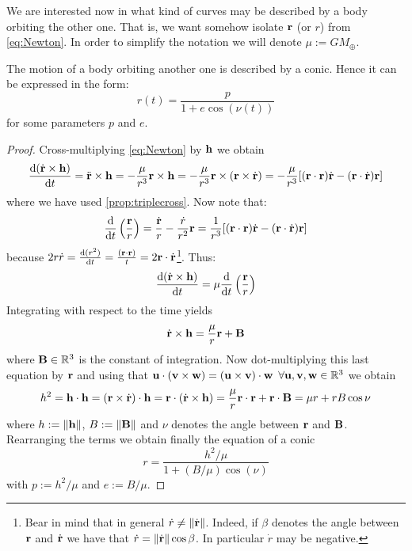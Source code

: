 \documentclass[../main.tex]{subfiles}
\begin{document}
We are interested now in what kind of curves may be described by a body orbiting the other one. That is, we want somehow isolate $\boldsymbol{\mathrm{r}}$ (or $r$) from \cref{eq:Newton}. In order to simplify the notation we will denote $\mu:=GM_{\oplus}$.
\begin{proposition}
  \label{prop:two-body}
  The motion of a body orbiting another one is described by a conic. Hence it can be expressed in the form:
  \begin{equation}
    \label{eq:two-body}
    r(t)=\frac{p}{1+e\cos (\nu(t))}
  \end{equation}
  for some parameters $p$ and $e$.
\end{proposition}
\begin{proof}
  Cross-multiplying \cref{eq:Newton} by $\boldsymbol{\mathrm{h}}$ we obtain
  \begin{equation}
    \dv{(\dot{\boldsymbol{\mathrm{r}}}\times\boldsymbol{\mathrm{h}})}{t}=\ddot{\boldsymbol{\mathrm{r}}}\times\boldsymbol{\mathrm{h}}=-\frac{\mu}{r^3}\boldsymbol{\mathrm{r}}\times\boldsymbol{\mathrm{h}}=-\frac{\mu}{r^3}\boldsymbol{\mathrm{r}}\times(\boldsymbol{\mathrm{r}}\times \dot{\boldsymbol{\mathrm{r}}})=-\frac{\mu}{r^3}[(\boldsymbol{\mathrm{r}}\cdot{\boldsymbol{\mathrm{r}}})\dot{\boldsymbol{\mathrm{r}}}-(\boldsymbol{\mathrm{r}}\cdot\dot{\boldsymbol{\mathrm{r}}})\boldsymbol{\mathrm{r}}]
  \end{equation}
  where we have used \cref{prop:triplecross}. Now note that:
  \begin{equation}
    \dv{}{t}\left(\frac{\boldsymbol{\mathrm{r}}}{r}\right)=\frac{\dot{\boldsymbol{\mathrm{r}}}}{r}-\frac{\dot{r}}{r^2}\boldsymbol{\mathrm{r}}= \frac{1}{r^3}[(\boldsymbol{\mathrm{r}}\cdot{\boldsymbol{\mathrm{r}}})\dot{\boldsymbol{\mathrm{r}}}-(\boldsymbol{\mathrm{r}}\cdot\dot{\boldsymbol{\mathrm{r}}})\boldsymbol{\mathrm{r}}]
  \end{equation}
  because $2r\dot{r}=\dv{(r^2)}{t}=\frac{(\boldsymbol{\mathrm{r}}\cdot\boldsymbol{\mathrm{r}})}{t}=2\boldsymbol{\mathrm{r}}\cdot\dot{\boldsymbol{\mathrm{r}}}$\footnote{Bear in mind that in general $\dot{r}\ne\left\|\dot{\boldsymbol{\mathrm{r}}}\right\|$. Indeed, if $\beta$ denotes the angle between $\boldsymbol{\mathrm{r}}$ and $\dot{\boldsymbol{\mathrm{r}}}$ we have that $\dot{r}=\left\|\dot{\boldsymbol{\mathrm{r}}}\right\|\cos\beta$. In particular $\dot{r}$ may be negative.}. Thus:
  \begin{equation}
    \dv{(\dot{\boldsymbol{\mathrm{r}}}\times\boldsymbol{\mathrm{h}})}{t}=\mu \dv{}{t}\left(\frac{\boldsymbol{\mathrm{r}}}{r}\right)
  \end{equation}
  Integrating with respect to the time yields
  \begin{equation}
    \dot{\boldsymbol{\mathrm{r}}}\times \boldsymbol{\mathrm{h}}=\frac{\mu}{r}\boldsymbol{\mathrm{r}}+\boldsymbol{\mathrm{B}}
  \end{equation}
  where $\boldsymbol{\mathrm{B}}\in\mathbb{R}^3$ is the constant of integration. Now dot-multiplying this last equation by $\boldsymbol{\mathrm{r}}$ and using that $\boldsymbol{\mathrm{u}}\cdot(\boldsymbol{\mathrm{v}}\times\boldsymbol{\mathrm{w}})=(\boldsymbol{\mathrm{u}}\times\boldsymbol{\mathrm{v}})\cdot\boldsymbol{\mathrm{w}}$ $\forall\boldsymbol{\mathrm{u}},\boldsymbol{\mathrm{v}},\boldsymbol{\mathrm{w}}\in\mathbb{R}^3$ we obtain
  \begin{equation}
    h^2=\boldsymbol{\mathrm{h}}\cdot\boldsymbol{\mathrm{h}}=(\boldsymbol{\mathrm{r}}\times\dot{\boldsymbol{\mathrm{r}}})\cdot\boldsymbol{\mathrm{h}}=\boldsymbol{\mathrm{r}}\cdot(\dot{\boldsymbol{\mathrm{r}}}\times\boldsymbol{\mathrm{h}})=\frac{\mu}{r}\boldsymbol{\mathrm{r}}\cdot\boldsymbol{\mathrm{r}}+\boldsymbol{\mathrm{r}}\cdot\boldsymbol{\mathrm{B}}=\mu r+rB\cos\nu
  \end{equation}
  where $h:=\left\|\boldsymbol{\mathrm{h}}\right\|$, $B:=\left\|\boldsymbol{\mathrm{B}}\right\|$ and $\nu$ denotes the angle between $\boldsymbol{\mathrm{r}}$ and $\boldsymbol{\mathrm{B}}$. Rearranging the terms we obtain finally the equation of a conic
  \begin{equation}\label{eq:r_conic}
    r=\frac{h^2/\mu}{1+(B/\mu)\cos(\nu)}
  \end{equation}
  with $p:=h^2/\mu$ and $e:=B/\mu$.
\end{proof}
\end{document}
